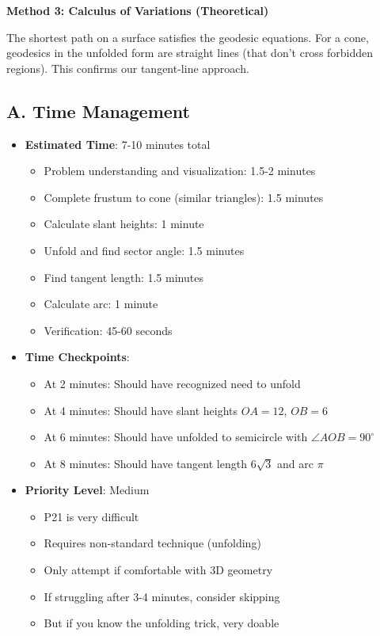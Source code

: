 \documentclass[12pt]{article}
\begin{document}
\begin{solutionbox}
\textbf{Method 3: Calculus of Variations (Theoretical)}

The shortest path on a surface satisfies the geodesic equations. For a cone, geodesics in the unfolded form are straight lines (that don't cross forbidden regions). This confirms our tangent-line approach.

\end{solutionbox}

\begin{competitionbox}
\subsection*{A. Time Management}
\begin{itemize}[leftmargin=*]
    \item \textbf{Estimated Time}: 7-10 minutes total
    \begin{itemize}
        \item Problem understanding and visualization: 1.5-2 minutes
        \item Complete frustum to cone (similar triangles): 1.5 minutes
        \item Calculate slant heights: 1 minute
        \item Unfold and find sector angle: 1.5 minutes
        \item Find tangent length: 1.5 minutes
        \item Calculate arc: 1 minute
        \item Verification: 45-60 seconds
    \end{itemize}
    \item \textbf{Time Checkpoints}: 
    \begin{itemize}
        \item At 2 minutes: Should have recognized need to unfold
        \item At 4 minutes: Should have slant heights $OA = 12$, $OB = 6$
        \item At 6 minutes: Should have unfolded to semicircle with $\angle AOB = 90^\circ$
        \item At 8 minutes: Should have tangent length $6\sqrt{3}$ and arc $\pi$
    \end{itemize}
    \item \textbf{Priority Level}: Medium
    \begin{itemize}
        \item P21 is very difficult
        \item Requires non-standard technique (unfolding)
        \item Only attempt if comfortable with 3D geometry
        \item If struggling after 3-4 minutes, consider skipping
        \item But if you know the unfolding trick, very doable
    \end{itemize}
\end{itemize}


\end{competitionbox}
\end{document}
